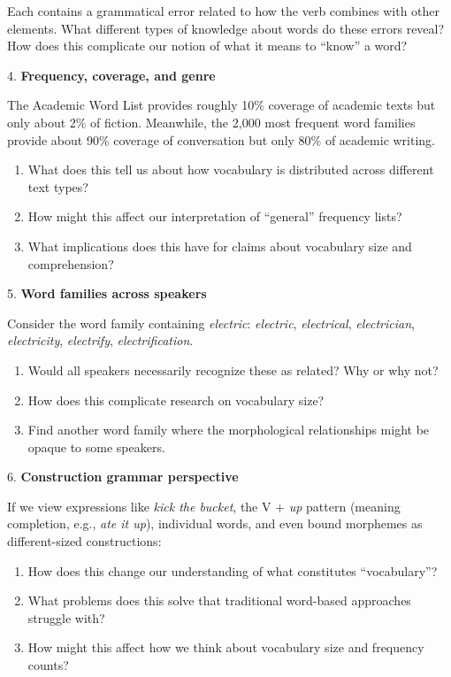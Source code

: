 \begin{tcolorbox}[title=Advanced Exercises, colback=white, colframe=red!75!black, fonttitle=\bfseries, breakable]
 Each contains a grammatical error related to how the verb combines with other elements. What different types of knowledge about words do these errors reveal? How does this complicate our notion of what it means to ``know'' a word?

4. \textbf{Frequency, coverage, and genre}
 
 The Academic Word List provides roughly 10\% coverage of academic texts but only about 2\% of fiction. Meanwhile, the 2,000 most frequent word families provide about 90\% coverage of conversation but only 80\% of academic writing.
 \begin{enumerate}[nosep]
 \item What does this tell us about how vocabulary is distributed across different text types?
 \item How might this affect our interpretation of ``general'' frequency lists?
 \item What implications does this have for claims about vocabulary size and comprehension?
 \end{enumerate}

5. \textbf{Word families across speakers}
 
 Consider the word family containing \textit{electric}: \textit{electric}, \textit{electrical}, \textit{electrician}, \textit{electricity}, \textit{electrify}, \textit{electrification}.
 \begin{enumerate}[nosep]
 \item Would all speakers necessarily recognize these as related? Why or why not?
 \item How does this complicate research on vocabulary size?
 \item Find another word family where the morphological relationships might be opaque to some speakers.
 \end{enumerate}

6. \textbf{Construction grammar perspective}
 
 If we view expressions like \textit{kick the bucket}, the V + \textit{up} pattern (meaning completion, e.g., \textit{ate it up}), individual words, and even bound morphemes as different-sized constructions:
 \begin{enumerate}[nosep]
 \item How does this change our understanding of what constitutes ``vocabulary''?
 \item What problems does this solve that traditional word-based approaches struggle with?
 \item How might this affect how we think about vocabulary size and frequency counts?
 \end{enumerate}
\end{tcolorbox}